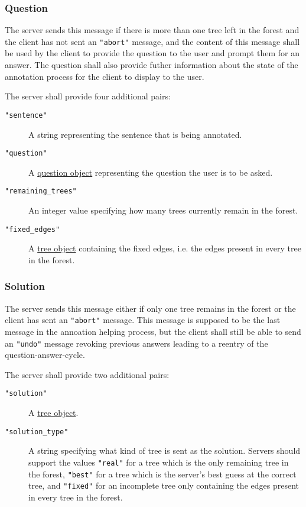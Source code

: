 \documentclass{scrartcl}
\newcommand{\jsstring}[1]{\texttt{\color{OrangeRed}"#1"}}
\begin{document}
\subsubsection{Question}
\label{ssub:Question}

The server sends this message if there is more than one tree left in the forest and the client has not sent an \jsstring{abort} message,
and the content of this message shall be used by the client to provide the question to the user and prompt them for an answer.
The question shall also provide futher information about the state of the annotation process for the client to display to the user.

The server shall provide four additional pairs:
\begin{description}
    \item[\jsstring{sentence}] A string representing the sentence that is being annotated.
    \item[\jsstring{question}] A \hyperref[ssub:Question object]{question object} representing the question the user is to be asked.
    \item[\jsstring{remaining\_trees}] An integer value specifying how many trees currently remain in the forest.
    \item[\jsstring{fixed\_edges}] A \hyperref[ssub:Tree object]{tree object} containing the fixed edges, i.e. the edges present in every tree in the forest.
\end{description}

\subsubsection{Solution}
\label{ssub:Solution}

The server sends this message either if only one tree remains in the forest or the client has sent an \jsstring{abort} message.
This message is supposed to be the last message in the annoation helping process, but the client shall still be able to send an \jsstring{undo} message revoking previous answers leading to a reentry of the question-answer-cycle.

The server shall provide two additional pairs:
\begin{description}
    \item[\jsstring{solution}] A \hyperref[ssub:Tree object]{tree object}.
    \item[\jsstring{solution\_type}] A string specifying what kind of tree is sent as the solution.
        Servers should support the values \jsstring{real} for a tree which is the only remaining tree in the forest, \jsstring{best} for a tree which is the server’s best guess at the correct tree, and \jsstring{fixed} for an incomplete tree only containing the edges present in every tree in the forest.
\end{description}
\end{document}
